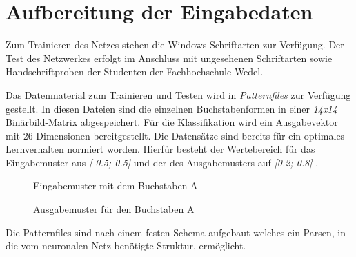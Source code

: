 \chapter{Aufbereitung der Eingabedaten}
Zum Trainieren des Netzes stehen die Windows Schriftarten zur Verfügung. Der Test des Netzwerkes erfolgt im Anschluss mit ungesehenen Schriftarten sowie Handschriftproben der Studenten der Fachhochschule Wedel.

Das Datenmaterial zum Trainieren und Testen wird in \emph{Patternfiles} zur Verfügung gestellt. In diesen Dateien sind die einzelnen Buchstabenformen in einer \emph{14x14} Binärbild-Matrix abgespeichert. Für die Klassifikation wird ein Ausgabevektor mit 26 Dimensionen bereitgestellt. Die Datensätze sind bereits für ein optimales Lernverhalten normiert worden. Hierfür besteht der Wertebereich für das Eingabemuster aus \emph{[-0.5; 0.5]}  und der des Ausgabemusters auf \emph{[0.2; 0.8]} .

\begin{figure}[h!]
	\begin{center}
	\caption{Eingabemuster mit dem Buchstaben A}
	\label{binary_a}
	\end{center}
\end{figure}

\begin{figure}[h!]
	\begin{center}
	\caption{Ausgabemuster für den Buchstaben A}
	\label{binary_alph}
	\end{center}
\end{figure}

Die Patternfiles sind nach einem festen Schema  aufgebaut welches ein Parsen, in die vom neuronalen Netz benötigte Struktur, ermöglicht.

